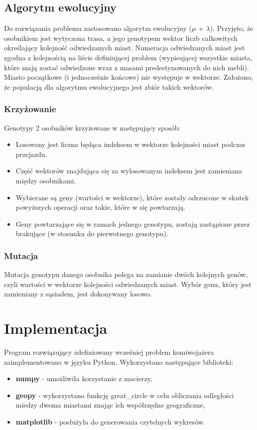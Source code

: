 \documentclass[12pt, oneside, final]{report}
\begin{document}
\section{Algorytm ewolucyjny}
Do rozwiązania problemu zastosowano algorytm ewolucyjny ($\mu$ + $\lambda$). Przyjęto, że osobnikiem jest wytyczona trasa, a jego genotypem wektor liczb całkowitych określający kolejność odwiedzanych miast. Numeracja odwiedzanych miast jest zgodna z kolejnością na liście definiującej problem (wypisującej wszystkie miasta, które mają zostać odwiedzone wraz z masami predestynowanych do nich mebli). Miasto początkowe (i jednocześnie końcowe) nie występuje w wektorze. Założono, że populacją dla algorytmu ewolucyjnego jest zbiór takich wektorów.

\subsection{Krzyżowanie}
Genotypy 2 osobników krzyżowane w następujący sposób:
\begin{itemize}
\item Losowany jest liczna będąca indeksem w wektorze kolejności miast podczas przejazdu.
\item Część wektorów znajdująca się za wylosowanym indeksem jest zamieniana między osobnikami.
\item Wybierane są geny (wartości w wektorze), które zostały odrzucone w skutek powyższych operacji oraz takie, które w się powtarzają.
\item Geny powtarzające się w ramach jednego genotypu, zostają zastąpione przez brakujące (w stosunku do pierwotnego genotypu).
\end{itemize}

\subsection{Mutacja}
Mutacja genotypu danego osobnika polega na zamianie dwóch kolejnych genów, czyli wartości w wektorze kolejności odwiedzanych miast. Wybór genu, który jest zamieniany z sąsiadem, jest dokonywany losowo.

\chapter{Implementacja}
Program rozwiązujący zdefiniowany wcześniej problem komiwojażera zaimplementowano w języku Python. Wykorzystano następujące biblioteki:
\begin{itemize}
\item \textbf{numpy} - umożliwiła korzystanie z macierzy,
\item \textbf{geopy} - wykorzystano funkcję great\_circle w celu obliczania odległości miedzy dwoma miastami znając ich współrzędne geograficzne,
\item \textbf{matplotlib} - posłużyła do generowania czytelnych wykresów.
\end{itemize}
\end{document}

